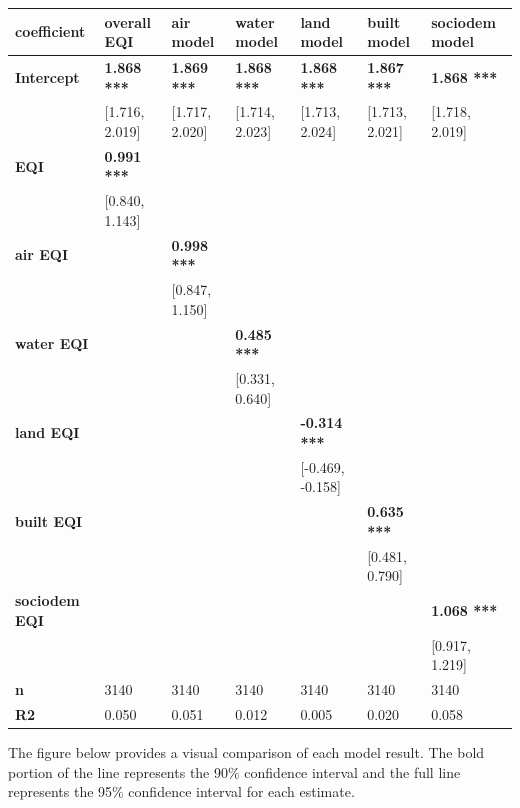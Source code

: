 \documentclass[
]{article}
\begin{document}
\begin{table}
\centering
\begin{tabular}{>{}l|l|l|l|l|l|l}
\hline
\textbf{coefficient} & \textbf{overall EQI} & \textbf{air model} & \textbf{water model} & \textbf{land model} & \textbf{built model} & \textbf{sociodem model}\\
\hline
\textbf{\textbf{Intercept}} & \textbf{1.868 ***} & \textbf{1.869 ***} & \textbf{1.868 ***} & \textbf{1.868 ***} & \textbf{1.867 ***} & \textbf{1.868 ***}\\
\hline
\textbf{} & [1.716, 2.019] & [1.717, 2.020] & [1.714, 2.023] & [1.713, 2.024] & [1.713, 2.021] & [1.718, 2.019]\\
\hline
\textbf{\textbf{EQI}} & \textbf{0.991 ***} & \textbf{} & \textbf{} & \textbf{} & \textbf{} & \textbf{}\\
\hline
\textbf{} & [0.840, 1.143] &  &  &  &  & \\
\hline
\textbf{\textbf{air EQI}} & \textbf{} & \textbf{0.998 ***} & \textbf{} & \textbf{} & \textbf{} & \textbf{}\\
\hline
\textbf{} &  & [0.847, 1.150] &  &  &  & \\
\hline
\textbf{\textbf{water EQI}} & \textbf{} & \textbf{} & \textbf{0.485 ***} & \textbf{} & \textbf{} & \textbf{}\\
\hline
\textbf{} &  &  & [0.331, 0.640] &  &  & \\
\hline
\textbf{\textbf{land EQI}} & \textbf{} & \textbf{} & \textbf{} & \textbf{-0.314 ***} & \textbf{} & \textbf{}\\
\hline
\textbf{} &  &  &  & [-0.469, -0.158] &  & \\
\hline
\textbf{\textbf{built EQI}} & \textbf{} & \textbf{} & \textbf{} & \textbf{} & \textbf{0.635 ***} & \textbf{}\\
\hline
\textbf{} &  &  &  &  & [0.481, 0.790] & \\
\hline
\textbf{\textbf{sociodem EQI}} & \textbf{} & \textbf{} & \textbf{} & \textbf{} & \textbf{} & \textbf{1.068 ***}\\
\hline
\textbf{} &  &  &  &  &  & [0.917, 1.219]\\
\hline
\textbf{n} & 3140 & 3140 & 3140 & 3140 & 3140 & 3140\\
\hline
\textbf{R2} & 0.050 & 0.051 & 0.012 & 0.005 & 0.020 & 0.058\\
\hline
\end{tabular}
\end{table}

The figure below provides a visual comparison of each model result. The
bold portion of the line represents the 90\% confidence interval and the
full line represents the 95\% confidence interval for each estimate.
\end{document}
